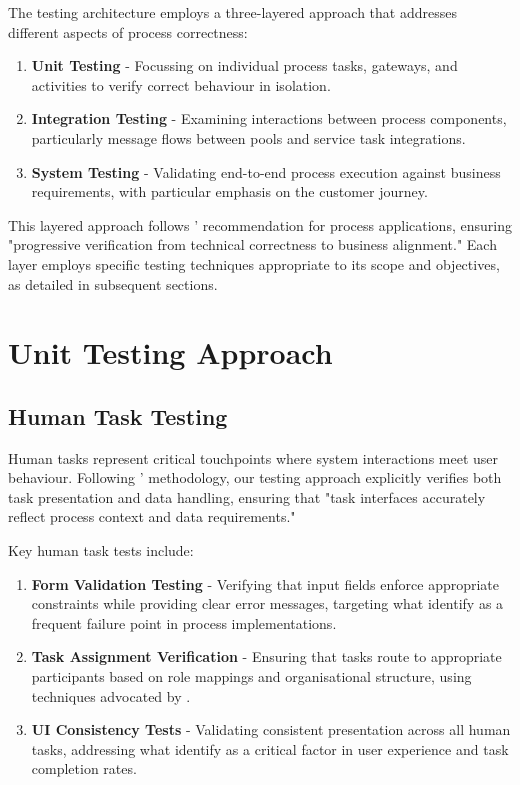 \documentclass[14pt,a4paper]{article}
\begin{document}
The testing architecture employs a three-layered approach that addresses different aspects of process correctness:

\begin{enumerate}
    \item \textbf{Unit Testing} - Focussing on individual process tasks, gateways, and activities to verify correct behaviour in isolation.

    \item \textbf{Integration Testing} - Examining interactions between process components, particularly message flows between pools and service task integrations.

    \item \textbf{System Testing} - Validating end-to-end process execution against business requirements, with particular emphasis on the customer journey.
\end{enumerate}

This layered approach follows \textit{\parencite[p. 92]{Garcia-Borgonon2017}}' recommendation for process applications, ensuring "progressive verification from technical correctness to business alignment." Each layer employs specific testing techniques appropriate to its scope and objectives, as detailed in subsequent sections.

\section{Unit Testing Approach}

\subsection{Human Task Testing}

Human tasks represent critical touchpoints where system interactions meet user behaviour. Following \textit{\parencite[p. 217]{Martinho2015}}' methodology, our testing approach explicitly verifies both task presentation and data handling, ensuring that "task interfaces accurately reflect process context and data requirements."

Key human task tests include:

\begin{enumerate}
    \item \textbf{Form Validation Testing} - Verifying that input fields enforce appropriate constraints while providing clear error messages, targeting what \textit{\parencite[p. 124]{Grossmann2008}} identify as a frequent failure point in process implementations.

    \item \textbf{Task Assignment Verification} - Ensuring that tasks route to appropriate participants based on role mappings and organisational structure, using techniques advocated by \textit{\parencite[p. 186]{Bozkurt2013}}.

    \item \textbf{UI Consistency Tests} - Validating consistent presentation across all human tasks, addressing what \textit{\parencite[p. 69]{Yotyawilai2014}} identify as a critical factor in user experience and task completion rates.
\end{enumerate}
\end{document}

